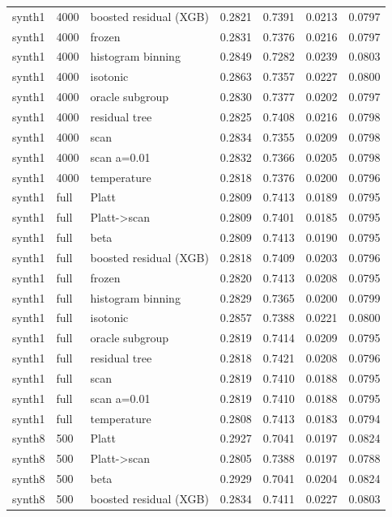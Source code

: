 \begin{tabular}{lllrrrr}
synth1 & 4000 & boosted residual (XGB) & 0.2821 & 0.7391 & 0.0213 & 0.0797 \\
synth1 & 4000 & frozen & 0.2831 & 0.7376 & 0.0216 & 0.0797 \\
synth1 & 4000 & histogram binning & 0.2849 & 0.7282 & 0.0239 & 0.0803 \\
synth1 & 4000 & isotonic & 0.2863 & 0.7357 & 0.0227 & 0.0800 \\
synth1 & 4000 & oracle subgroup & 0.2830 & 0.7377 & 0.0202 & 0.0797 \\
synth1 & 4000 & residual tree & 0.2825 & 0.7408 & 0.0216 & 0.0798 \\
synth1 & 4000 & scan & 0.2834 & 0.7355 & 0.0209 & 0.0798 \\
synth1 & 4000 & scan a=0.01 & 0.2832 & 0.7366 & 0.0205 & 0.0798 \\
synth1 & 4000 & temperature & 0.2818 & 0.7376 & 0.0200 & 0.0796 \\
synth1 & full & Platt & 0.2809 & 0.7413 & 0.0189 & 0.0795 \\
synth1 & full & Platt->scan & 0.2809 & 0.7401 & 0.0185 & 0.0795 \\
synth1 & full & beta & 0.2809 & 0.7413 & 0.0190 & 0.0795 \\
synth1 & full & boosted residual (XGB) & 0.2818 & 0.7409 & 0.0203 & 0.0796 \\
synth1 & full & frozen & 0.2820 & 0.7413 & 0.0208 & 0.0795 \\
synth1 & full & histogram binning & 0.2829 & 0.7365 & 0.0200 & 0.0799 \\
synth1 & full & isotonic & 0.2857 & 0.7388 & 0.0221 & 0.0800 \\
synth1 & full & oracle subgroup & 0.2819 & 0.7414 & 0.0209 & 0.0795 \\
synth1 & full & residual tree & 0.2818 & 0.7421 & 0.0208 & 0.0796 \\
synth1 & full & scan & 0.2819 & 0.7410 & 0.0188 & 0.0795 \\
synth1 & full & scan a=0.01 & 0.2819 & 0.7410 & 0.0188 & 0.0795 \\
synth1 & full & temperature & 0.2808 & 0.7413 & 0.0183 & 0.0794 \\
synth8 & 500 & Platt & 0.2927 & 0.7041 & 0.0197 & 0.0824 \\
synth8 & 500 & Platt->scan & 0.2805 & 0.7388 & 0.0197 & 0.0788 \\
synth8 & 500 & beta & 0.2929 & 0.7041 & 0.0204 & 0.0824 \\
synth8 & 500 & boosted residual (XGB) & 0.2834 & 0.7411 & 0.0227 & 0.0803 \\

\end{tabular}
